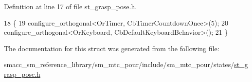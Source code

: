 Definition at line 17 of file st\+\_\+grasp\+\_\+pose.\+h.


\begin{DoxyCode}
18     \{
19         configure\_orthogonal<OrTimer,  CbTimerCountdownOnce>(5);    
20         configure\_orthogonal<OrKeyboard, CbDefaultKeyboardBehavior>();
21     \}
\end{DoxyCode}


The documentation for this struct was generated from the following file\+:\begin{DoxyCompactItemize}
\item 
smacc\+\_\+sm\+\_\+reference\+\_\+library/sm\+\_\+mtc\+\_\+pour/include/sm\+\_\+mtc\+\_\+pour/states/\hyperlink{st__grasp__pose_8h}{st\+\_\+grasp\+\_\+pose.\+h}\end{DoxyCompactItemize}
